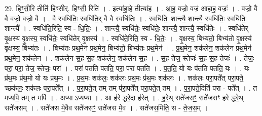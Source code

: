 \documentclass[17pt]{extarticle}
\begin{document}
29. हिꣳ॒॒सी॒रि तीति॑ हिꣳसीर्. हिꣳसी॒ रिति॑ । . इत्या॑हा॒हे तीत्या॑ह । . आ॒ह॒ वज्रो॒ वज्र॑ आहाह॒ वज्रः॑ । . वज्रो॒ वै वै वज्रो॒ वज्रो॒ वै । . वै स्वधि॑तिः॒ स्वधि॑ति॒र् वै वै स्वधि॑तिः । . स्वधि॑तिः॒ शान्त्यै॒ शान्त्यै॒ स्वधि॑तिः॒ स्वधि॑तिः॒ शान्त्यै᳚ । . स्वधि॑ति॒रिति॒ स्व - धि॒तिः॒ । . शान्त्यै॒ स्वधि॑तेः॒ स्वधि॑तेः॒ शान्त्यै॒ शान्त्यै॒ स्वधि॑तेः । . स्वधि॑तेर् वृ॒क्षस्य॑ वृ॒क्षस्य॒ स्वधि॑तेः॒ स्वधि॑तेर् वृ॒क्षस्य॑ । . स्वधि॑ते॒रिति॒ स्व - धि॒तेः॒ । . वृ॒क्षस्य॒ बिभ्य॑तो॒ बिभ्य॑तो वृ॒क्षस्य॑ वृ॒क्षस्य॒ बिभ्य॑तः । . बिभ्य॑तः प्रथ॒मेन॑ प्रथ॒मेन॒ बिभ्य॑तो॒ बिभ्य॑तः प्रथ॒मेन॑ । . प्र॒थ॒मेन॒ शक॑लेन॒ शक॑लेन प्रथ॒मेन॑ प्रथ॒मेन॒ शक॑लेन । . शक॑लेन स॒ह स॒ह शक॑लेन॒ शक॑लेन स॒ह । . स॒ह तेज॒ स्तेजः॑ स॒ह स॒ह तेजः॑ । . तेजः॒ परा॒ परा॒ तेज॒ स्तेजः॒ परा᳚ । . परा॑ पतति पतति॒ परा॒ परा॑ पतति । . प॒त॒ति॒ यो यः प॑तति पतति॒ यः । . यः प्र॑थ॒मः प्र॑थ॒मो यो यः प्र॑थ॒मः । . प्र॒थ॒मः शक॑लः॒ शक॑लः प्रथ॒मः प्र॑थ॒मः शक॑लः । . शक॑लः परा॒पते᳚त् परा॒पते॒ च्छक॑लः॒ शक॑लः परा॒पते᳚त् । . प॒रा॒पते॒त् तम् तम् प॑रा॒पते᳚त् परा॒पते॒त् तम् । . प॒रा॒पते॒दिति॑ परा - पते᳚त् । . त मप्यपि॒ तम् त मपि॑ । . अप्या ऽप्यप्या । . आ ह॑रे द्धरे॒दा ह॑रेत् । . ह॒रे॒थ् सते॑जसꣳ॒॒ सते॑जसꣳ हरे द्धरे॒थ् सते॑जसम् । . सते॑जस मे॒वैव सते॑जसꣳ॒॒ सते॑जस मे॒व । . सते॑जस॒मिति॒ स - ते॒ज॒स॒म् । \newline
\end{document}
